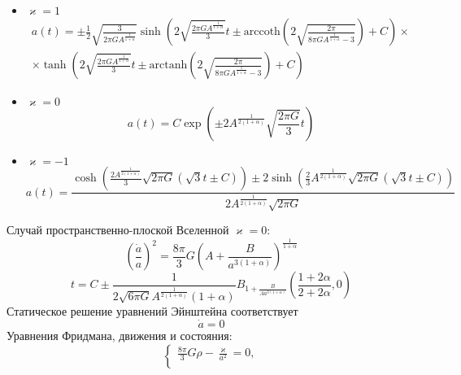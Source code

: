 \documentclass[12pt]{article}
\theoremstyle{definition}
\begin{document}
\begin{enumerate}
\begin{itemize}
\begin{equation}
        \end{equation}
        \begin{itemize}
            \item $\varkappa=1$
            \begin{multline}
                a(t)=\pm\frac{1}{2}\sqrt{\frac{3}{2\pi GA^\frac{1}{1+\alpha}}}\sinh\left(2\sqrt{\frac{2\pi GA^\frac{1}{1+\alpha}}{3}}t\pm\text{arccoth}\left(2\sqrt{\frac{2\pi}{8\pi GA^\frac{1}{1+\alpha}-3}}\right)+C\right)\times\\\times\tanh\left(2\sqrt{\frac{2\pi GA^\frac{1}{1+\alpha}}{3}}t\pm\text{arctanh}\left(2\sqrt{\frac{2\pi}{8\pi GA^\frac{1}{1+\alpha}-3}}\right)+C\right)
            \end{multline}
            \item $\varkappa=0$
            \begin{equation}
                \boxed{a(t)=C\exp\left(\pm2A^\frac{1}{2(1+\alpha)}\sqrt{\frac{2\pi G}{3}}t\right)}
            \end{equation}
            \item $\varkappa=-1$
            \begin{equation}
                \boxed{a(t)=\frac{\cosh(\frac{2A^\frac{1}{2(1+\alpha)}}{3}\sqrt{2\pi G}(\sqrt{3}t\pm C))\pm2\sinh(\frac{2}{3}A^\frac{1}{2(1+\alpha)}\sqrt{2\pi G}(\sqrt{3}t\pm C))}{2A^\frac{1}{2(1+\alpha)}\sqrt{2\pi G}}}
            \end{equation}
    \end{itemize}
    Случай пространственно-плоской Вселенной $\varkappa=0$:
    \begin{equation}
        \left(\frac{\dot{a}}{a}\right)^2=\frac{8\pi}{3}G\left(A+\frac{B}{a^{3(1+\alpha)}}\right)^{\frac{1}{1+\alpha}}
    \end{equation}
    \begin{equation}
        \boxed{t=C\pm\frac{1}{2\sqrt{6\pi G}A^\frac{1}{2(1+\alpha)}(1+\alpha)}B_{1+\frac{B}{Aa^{3(1+\alpha)}}}\left(\frac{1+2\alpha}{2+2\alpha},0\right)}
    \end{equation}
    Статическое решение уравнений Эйнштейна соответствует
        \begin{equation}
            \dot{a}=0
        \end{equation}
        Уравнения Фридмана, движения и состояния:
        \begin{equation}
        \begin{cases}
            \frac{8\pi}{3}G\rho-\frac{\varkappa}{a^2}=0,\\

\end{cases}
\end{equation}
\end{itemize}
\end{enumerate}
\end{document}
